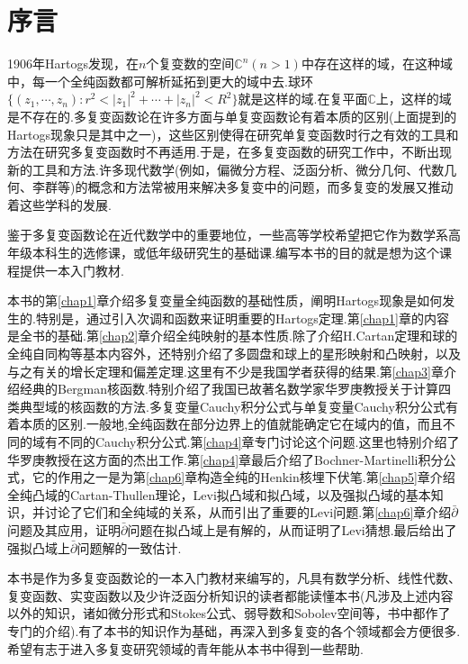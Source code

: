 

\chapter*{序\qquad 言}

1906年Hartogs发现，在$n$个复变数的空间$\mathbb{C}^n(n>1)$中存在这样的域，在这种域中，每一个全纯函数都可解析延拓到更大的域中去.球环$\{(z_1,\cdots,z_n)\colon r^2<|z_1|^2+\cdots+|z_n|^2<R^2\}$就是这样的域.在复平面$\mathbb{C}$上，这样的域是不存在的.多复变函数论在许多方面与单复变函数论有着本质的区别(上面提到的Hartogs现象只是其中之一)，这些区别使得在研究单复变函数时行之有效的工具和方法在研究多复变函数时不再适用.于是，在多复变函数的研究工作中，不断出现新的工具和方法.许多现代数学(例如，偏微分方程、泛函分析、微分几何、代数几何、李群等)的概念和方法常被用来解决多复变中的问题，而多复变的发展又推动着这些学科的发展.

鉴于多复变函数论在近代数学中的重要地位，一些高等学校希望把它作为数学系高年级本科生的选修课，或低年级研究生的基础课.编写本书的目的就是想为这个课程提供一本入门教材.

本书的第\ref{chap1}章介绍多复变量全纯函数的基础性质，阐明Hartogs现象是如何发生的.特别是，通过引入次调和函数来证明重要的Hartogs定理.第\ref{chap1}章的内容是全书的基础.第\ref{chap2}章介绍全纯映射的基本性质.除了介绍H.Cartan定理和球的全纯自同构等基本内容外，还特别介绍了多圆盘和球上的星形映射和凸映射，以及与之有关的增长定理和偏差定理.这里有不少是我国学者获得的结果.第\ref{chap3}章介绍经典的Bergman核函数.特别介绍了我国已故著名数学家华罗庚教授关于计算四类典型域的核函数的方法.多复变量Cauchy积分公式与单复变量Cauchy积分公式有着本质的区别.一般地,全纯函数在部分边界上的值就能确定它在域内的值，而且不同的域有不同的Cauchy积分公式.第\ref{chap4}章专门讨论这个问题.这里也特别介绍了华罗庚教授在这方面的杰出工作.第\ref{chap4}章最后介绍了Bochner-Martinelli积分公式，它的作用之一是为第\ref{chap6}章构造全纯的Henkin核埋下伏笔.第\ref{chap5}章介绍全纯凸域的Cartan-Thullen理论，Levi拟凸域和拟凸域，以及强拟凸域的基本知识，并讨论了它们和全纯域的关系，从而引出了重要的Levi问题.第\ref{chap6}章介绍$\bar{\partial}$问题及其应用，证明$\bar{\partial}$问题在拟凸域上是有解的，从而证明了Levi猜想.最后给出了强拟凸域上$\bar{\partial}$问题解的一致估计.

本书是作为多复变函数论的一本入门教材来编写的，凡具有数学分析、线性代数、复变函数、实变函数以及少许泛函分析知识的读者都能读懂本书(凡涉及上述内容以外的知识，诸如微分形式和Stokes公式、弱导数和Sobolev空间等，书中都作了专门的介绍).有了本书的知识作为基础，再深入到多复变的各个领域都会方便很多.希望有志于进入多复变研究领域的青年能从本书中得到一些帮助.

